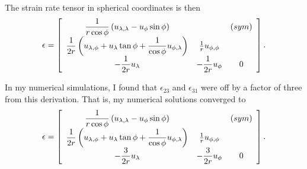 \documentclass[11pt]{report}
\begin{document}
The strain rate tensor in spherical coordinates is then
\begin{eqnarray}
\epsilon = \left[\begin{array}{ccc}
\displaystyle
\frac{1}{r\cos\phi} \left( u_{\lambda,\lambda} -  u_\phi\sin\phi \right) &  & (sym) \\
\displaystyle
\frac{1}{2r}\left(u_{\lambda,\phi} + u_\lambda \tan\phi  +  \frac{1}{\cos\phi}u_{\phi,\lambda}  \right)
\displaystyle
   & \frac{1}{r} u_{\phi,\phi}  & \\
\displaystyle
 - \frac{1}{2r}u_\lambda &  
\displaystyle
 - \frac{1}{2r}u_\phi  & 0
\end{array}\right].
\end{eqnarray}

In my numerical simulations, I found that $\epsilon_{23}$ and $\epsilon_{31}$ were off by a factor of three from this derivation.  That is, my numerical solutions converged to
\begin{eqnarray}
\epsilon = \left[\begin{array}{ccc}
\displaystyle
\frac{1}{r\cos\phi} \left( u_{\lambda,\lambda} -  u_\phi\sin\phi \right) &  & (sym) \\
\displaystyle
\frac{1}{2r}\left(u_{\lambda,\phi} + u_\lambda \tan\phi  +  \frac{1}{\cos\phi}u_{\phi,\lambda}  \right)
\displaystyle
   & \frac{1}{r} u_{\phi,\phi}  & \\
\displaystyle
 - \frac{3}{2r}u_\lambda &  
\displaystyle
 - \frac{3}{2r}u_\phi  & 0
\end{array}\right].
\end{eqnarray}
\end{document}
